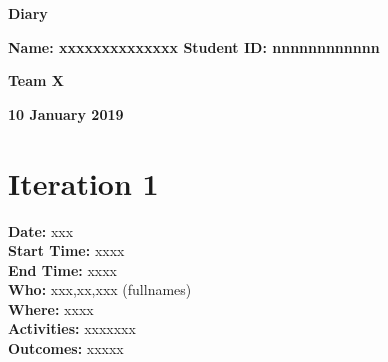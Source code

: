 \documentclass[12pt]{article}
\begin{document}
\vspace*{0.2in}
\centerline{\bf\Large Diary}

\vspace*{0.2in}
\centerline{\bf\Large Name: xxxxxxxxxxxxxx   Student ID: nnnnnnnnnnnn}

\vspace*{0.2in}
\centerline{\bf\Large Team X}

\vspace*{0.2in}
\centerline{\bf\Large 10 January 2019}

\section{Iteration 1}

{\bf Date:} xxx\\
{\bf Start Time:} xxxx\\
{\bf End Time:} xxxx \\
{\bf Who:} xxx,xx,xxx (fullnames)\\
{\bf Where:} xxxx \\
{\bf Activities:} xxxxxxx\\
{\bf Outcomes:} xxxxx\\


\end{document}
